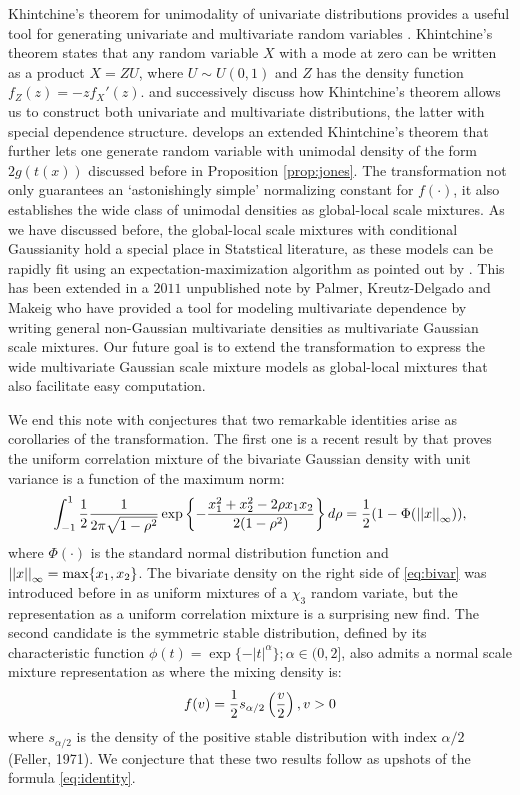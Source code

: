 \documentclass[lineno]{biometrika}
\begin{document}
Khintchine's theorem for unimodality of univariate distributions provides a useful tool for generating univariate and multivariate random variables \citep{bryson1982constructing}. Khintchine's theorem states that any random variable $X$ with a mode at zero can be written as a product $X = ZU$, where $U \sim U(0,1)$ and $Z$ has the density function $f_Z(z) = -zf_{X}'(z)$. \citep{bryson1982constructing} and successively \cite{jones2010distributions,jones2012khintchine} discuss how Khintchine's theorem allows us to construct both univariate and multivariate distributions, the latter with special dependence structure. \cite{jones2014generating} develops an extended Khintchine's theorem that further lets one generate random variable with unimodal density of the form $2g(t(x))$ discussed before in Proposition \ref{prop:jones}. The \CS transformation not only guarantees an `astonishingly simple' normalizing constant for $f(\cdot)$, it also establishes the wide class of unimodal densities as global-local scale mixtures. As we have discussed before, the global-local scale mixtures with conditional Gaussianity hold a special place in Statstical literature, as these models can be rapidly fit using an expectation-maximization algorithm as pointed out by \cite{polson2013data}. This has been extended in a $2011$ unpublished note by Palmer, Kreutz-Delgado and Makeig who have provided a tool for modeling multivariate dependence by writing general non-Gaussian multivariate densities as multivariate Gaussian scale mixtures. Our future goal is to extend the \CS transformation to express the wide multivariate Gaussian scale mixture models as global-local mixtures that also facilitate easy computation. \par

We end this note with conjectures that two remarkable identities arise as corollaries of the \CS transformation. The first one is a recent result by \cite{zhang2014uniform} that proves the uniform correlation mixture of the bivariate Gaussian density with unit variance is a function of the maximum norm: 
\begin{equation}
  \int_{-1}^{1} \half \frac{1}{2\pi\sqrt{1-\rho^2}} \exp \left\{ - \frac{x_1^2 + x_2^2 - 2 \rho x_1 x_2}{2(1-\rho^2)} \right\} d \rho = 
  \half (1- \Phi(\vectornorm{x}_{\infty})) \label{eq:bivar}, 
\end{equation}
where $\Phi(\cdot)$ is the standard normal distribution function and $\left|\left|x\right|\right|_{\infty} = \max \{ x_1, x_2\}$. The bivariate density on the right side of \eqref{eq:bivar} was introduced before in \cite{bryson1982constructing} as uniform mixtures of a $\chi_3$ random variate, but the representation as a uniform correlation mixture is a surprising new find. The second candidate is the symmetric stable distribution, defined by its characteristic function $\phi(t) = \exp\{ -|t|^{\alpha} \}; \alpha \in (0,2]$, also admits a normal scale mixture representation as where the mixing density is: 
$$
f(v) = \frac{1}{2} s_{\alpha/2} \left( \frac{v}{2} \right), v > 0 
$$
where $s_{\alpha/2}$ is the density of the positive stable distribution with index $\alpha / 2$ (Feller, 1971). We conjecture that these two results follow as upshots of the \CS formula \eqref{eq:identity}. 



\end{document}
